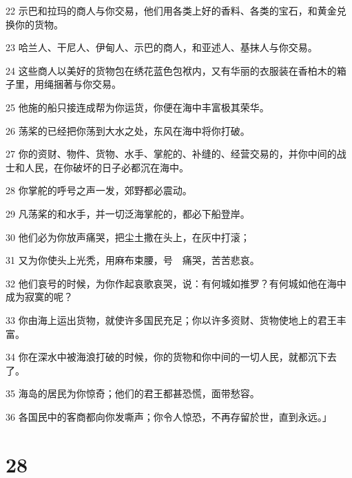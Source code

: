 \par 22 示巴和拉玛的商人与你交易，他们用各类上好的香料、各类的宝石，和黄金兑换你的货物。
\par 23 哈兰人、干尼人、伊甸人、示巴的商人，和亚述人、基抹人与你交易。
\par 24 这些商人以美好的货物包在绣花蓝色包袱内，又有华丽的衣服装在香柏木的箱子里，用绳捆著与你交易。
\par 25 他施的船只接连成帮为你运货，你便在海中丰富极其荣华。
\par 26 荡桨的已经把你荡到大水之处，东风在海中将你打破。
\par 27 你的资财、物件、货物、水手、掌舵的、补缝的、经营交易的，并你中间的战士和人民，在你破坏的日子必都沉在海中。
\par 28 你掌舵的呼号之声一发，郊野都必震动。
\par 29 凡荡桨的和水手，并一切泛海掌舵的，都必下船登岸。
\par 30 他们必为你放声痛哭，把尘土撒在头上，在灰中打滚；
\par 31 又为你使头上光秃，用麻布束腰，号　痛哭，苦苦悲哀。
\par 32 他们哀号的时候，为你作起哀歌哀哭，说：有何城如推罗？有何城如他在海中成为寂寞的呢？
\par 33 你由海上运出货物，就使许多国民充足；你以许多资财、货物使地上的君王丰富。
\par 34 你在深水中被海浪打破的时候，你的货物和你中间的一切人民，就都沉下去了。
\par 35 海岛的居民为你惊奇；他们的君王都甚恐慌，面带愁容。
\par 36 各国民中的客商都向你发嘶声；你令人惊恐，不再存留於世，直到永远。」

\chapter{28}

